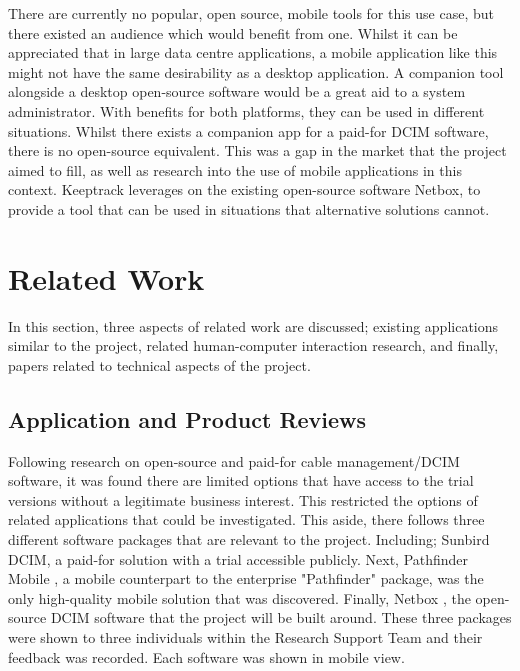 \documentclass [11pt,a4paper]{article}
\begin{document}
There are currently no popular, open source, mobile tools for this use case, but there existed an audience which would benefit from one. Whilst it can be appreciated that in large data centre applications, a mobile application like this might not have the same desirability as a desktop application. A companion tool alongside a desktop open-source software would be a great aid to a system administrator. With benefits for both platforms, they can be used in different situations. Whilst there exists a companion app for a paid-for DCIM software, there is no open-source equivalent. This was a gap in the market that the project aimed to fill, as well as research into the use of mobile applications in this context. Keeptrack leverages on the existing open-source software Netbox, to provide a tool that can be used in situations that alternative solutions cannot. 


\pagebreak

\section{Related Work}

In this section, three aspects of related work are discussed; existing applications similar to the project, related human-computer interaction research, and finally, papers related to technical aspects of the project.

\subsection{Application and Product Reviews}
\label{sec:app_reviews}

Following research on open-source and paid-for cable management/DCIM software, it was found there are limited options that have access to the trial versions without a legitimate business interest. This restricted the options of related applications that could be investigated. This aside, there follows three different software packages that are relevant to the project. Including; Sunbird DCIM\cite{Sunbird}, a paid-for solution with a trial accessible publicly. Next, Pathfinder Mobile \cite{Pathfinder}, a mobile counterpart to the enterprise "Pathfinder" package, was the only high-quality mobile solution that was discovered. Finally, Netbox \cite{Netbox}, the open-source DCIM software that the project will be built around. These three packages were shown to three individuals within the Research Support Team and their feedback was recorded. Each software was shown in mobile view. 
\end{document}
